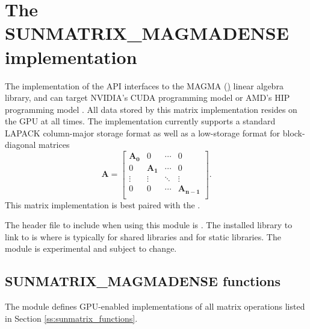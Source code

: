 \section{The SUNMATRIX\_MAGMADENSE implementation}\label{ss:sunmat_magmadense}

The  implementation of the {\sundials} 
API interfaces to the MAGMA (\href{https://icl.utk.edu/magma/}) linear algebra
library, and can target NVIDIA's CUDA programming model or AMD's HIP programming
model \cite{magma_ref}. All data stored by this matrix implementation resides on
the GPU at all times. The implementation currently supports a standard LAPACK
column-major storage format as well as a low-storage format for block-diagonal
matrices
\begin{equation*}
  \mathbf{A} =
  \begin{bmatrix}
    \mathbf{A_0} & 0 & \cdots & 0\\
    0 & \mathbf{A_1} & \cdots & 0\\
    \vdots & \vdots & \ddots & \vdots\\
    0 & 0 & \cdots & \mathbf{A_{n-1}}\\
  \end{bmatrix}.
\end{equation*}
This matrix implementation is best paired with the 
.

The header file to include when using this module is
. The installed library to link to is
 where  is typically 
for shared libraries and  for static libraries.
\newline
\newline
{\warn}The  module is experimental and subject to change.

\subsection{SUNMATRIX\_MAGMADENSE functions}
\label{ss:sunmat_magmadense_functions}

The  module defines GPU-enabled implementations
of all matrix operations listed in Section \ref{ss:sunmatrix_functions}.

